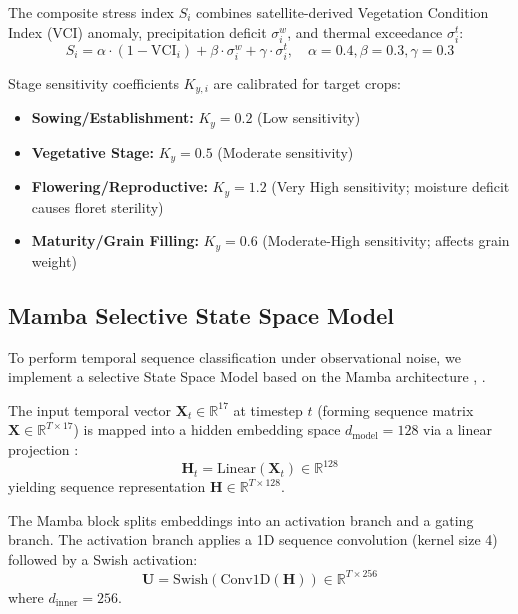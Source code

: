 \documentclass[conference]{IEEEtran}
\begin{document}
The composite stress index $S_i$ combines satellite-derived Vegetation Condition Index (VCI) anomaly, precipitation deficit $\sigma^w_i$, and thermal exceedance $\sigma^t_i$:
\begin{equation}
S_i = \alpha \cdot (1 - \text{VCI}_i) + \beta \cdot \sigma^w_i + \gamma \cdot \sigma^t_i, \quad \alpha=0.4, \beta=0.3, \gamma=0.3
\end{equation}

Stage sensitivity coefficients $K_{y,i}$ are calibrated for target crops:
\begin{itemize}
\item \textbf{Sowing/Establishment:} $K_y = 0.2$ (Low sensitivity)
\item \textbf{Vegetative Stage:} $K_y = 0.5$ (Moderate sensitivity)
\item \textbf{Flowering/Reproductive:} $K_y = 1.2$ (Very High sensitivity; moisture deficit causes floret sterility)
\item \textbf{Maturity/Grain Filling:} $K_y = 0.6$ (Moderate-High sensitivity; affects grain weight)
\end{itemize}

\subsection{Mamba Selective State Space Model}
To perform temporal sequence classification under observational noise, we implement a selective State Space Model based on the Mamba architecture \cite{b1}, \cite{b5}.

The input temporal vector $\mathbf{X}_t \in \mathbb{R}^{17}$ at timestep $t$ (forming sequence matrix $\mathbf{X} \in \mathbb{R}^{T \times 17}$) is mapped into a hidden embedding space $d_{\text{model}} = 128$ via a linear projection \cite{b4}:
\begin{equation}
\mathbf{H}_t = \text{Linear}(\mathbf{X}_t) \in \mathbb{R}^{128}
\end{equation}
yielding sequence representation $\mathbf{H} \in \mathbb{R}^{T \times 128}$.

The Mamba block splits embeddings into an activation branch and a gating branch. The activation branch applies a 1D sequence convolution (kernel size 4) followed by a Swish activation:
\begin{equation}
\mathbf{U} = \text{Swish}(\text{Conv1D}(\mathbf{H})) \in \mathbb{R}^{T \times 256}
\end{equation}
where $d_{\text{inner}} = 256$.
\end{document}
